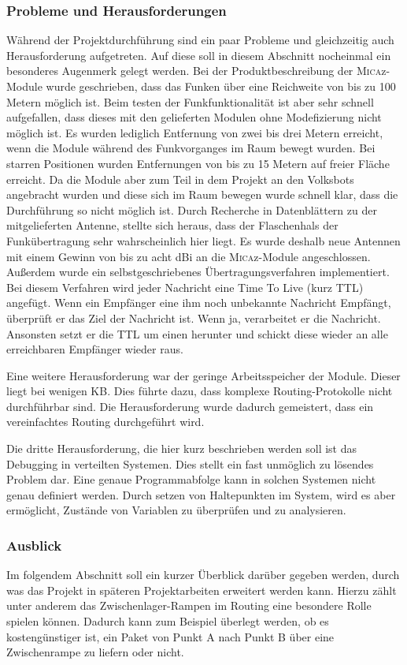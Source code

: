 \subsubsection{Probleme und Herausforderungen}
Während der Projektdurchführung sind ein paar Probleme und gleichzeitig auch Herausforderung aufgetreten. Auf diese soll in diesem Abschnitt nocheinmal ein besonderes Augenmerk gelegt werden. Bei der Produktbeschreibung der \textsc{Mica}z-Module wurde geschrieben, dass das Funken über eine Reichweite von bis zu 100 Metern möglich ist. Beim testen der Funkfunktionalität ist aber sehr schnell aufgefallen, dass dieses mit den gelieferten Modulen ohne Modefizierung nicht möglich ist. Es wurden lediglich Entfernung von zwei bis drei Metern erreicht, wenn die Module während des Funkvorganges im Raum bewegt wurden. Bei starren Positionen wurden Entfernungen von bis zu 15 Metern auf freier Fläche erreicht. Da die Module aber zum Teil in dem Projekt an den Volksbots angebracht wurden und diese sich im Raum bewegen wurde schnell klar, dass die Durchführung so nicht möglich ist. Durch Recherche in Datenblättern zu der mitgelieferten Antenne, stellte sich heraus, dass der Flaschenhals der Funkübertragung sehr wahrscheinlich hier liegt. Es wurde deshalb neue Antennen mit einem Gewinn von bis zu acht dBi an die \textsc{Mica}z-Module angeschlossen. Außerdem wurde ein selbstgeschriebenes Übertragungsverfahren implementiert. Bei diesem Verfahren wird jeder Nachricht eine Time To Live (kurz TTL) angefügt. Wenn ein Empfänger eine ihm noch unbekannte Nachricht Empfängt, überprüft er das Ziel der Nachricht ist. Wenn ja, verarbeitet er die Nachricht. Ansonsten setzt er die TTL um einen herunter und schickt diese wieder an alle erreichbaren Empfänger wieder raus.

Eine weitere Herausforderung war der geringe Arbeitsspeicher der Module. Dieser liegt bei wenigen KB. Dies führte dazu, dass komplexe Routing-Protokolle nicht durchführbar sind. Die Herausforderung wurde dadurch gemeistert, dass ein vereinfachtes Routing durchgeführt wird. 

Die dritte Herausforderung, die hier kurz beschrieben werden soll ist das Debugging in verteilten Systemen. Dies stellt ein fast unmöglich zu lösendes Problem dar. Eine genaue Programmabfolge kann in solchen Systemen nicht genau definiert werden. Durch setzen von Haltepunkten im System, wird es aber ermöglicht, Zustände von Variablen zu überprüfen und zu analysieren.

\subsubsection{Ausblick}
Im folgendem Abschnitt soll ein kurzer Überblick darüber gegeben werden, durch was das Projekt in späteren Projektarbeiten erweitert werden kann. Hierzu zählt unter anderem das Zwischenlager-Rampen im Routing eine besondere Rolle spielen können. Dadurch kann zum Beispiel überlegt werden, ob es kostengünstiger ist, ein Paket von Punkt A nach Punkt B über eine Zwischenrampe zu liefern oder nicht.

